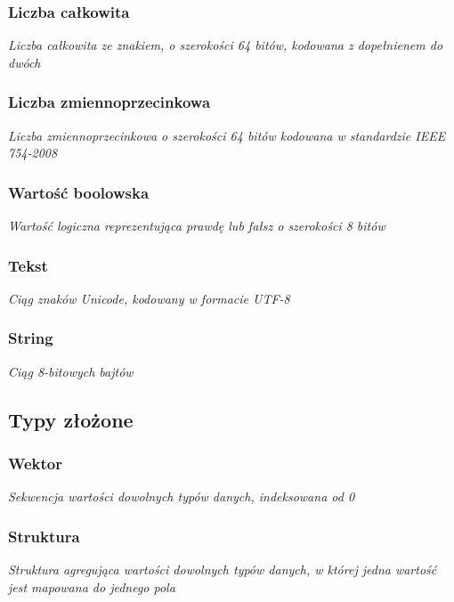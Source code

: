 \subsubsection{Liczba całkowita}

\emph{Liczba całkowita ze znakiem, o szerokości 64 bitów, kodowana z dopełnienem do
dwóch}

\subsubsection{Liczba zmiennoprzecinkowa}

\emph{Liczba zmiennoprzecinkowa o szerokości 64 bitów kodowana w standardzie IEEE 754-2008}

\subsubsection{Wartość boolowska}

\emph{Wartość logiczna reprezentująca prawdę lub fałsz o szerokości 8 bitów}

\subsubsection{Tekst}

\emph{Ciąg znaków Unicode, kodowany w formacie UTF-8}

\subsubsection{String}

\emph{Ciąg 8-bitowych bajtów}

\subsection{Typy złożone}

\subsubsection{Wektor}

\emph{Sekwencja wartości dowolnych typów danych, indeksowana od 0}

\subsubsection{Struktura}

\emph{Struktura agregująca wartości dowolnych typów danych, w której jedna
wartość jest mapowana do jednego pola}

